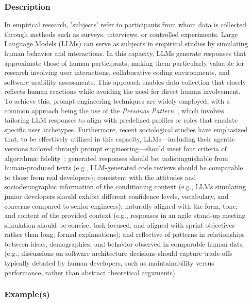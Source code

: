 \subsubsection{Description}

In empirical research, 'subjects' refer to participants from whom data is collected through methods such as surveys, interviews, or controlled experiments. Large Language Models (LLMs) can serve as subjects in empirical studies by simulating human behavior and interactions. In this capacity, LLMs generate responses that approximate those of human participants, making them particularly valuable for research involving user interactions, collaborative coding environments, and software usability assessments. This approach enables data collection that closely reflects human reactions while avoiding the need for direct human involvement.
To achieve this, prompt engineering techniques are widely employed, with a common approach being the use of the \textit{Personas Pattern}~\cite{DBLP:journals/corr/abs-2308-07702}, which involves tailoring LLM responses to align with predefined profiles or roles that emulate specific user archetypes. 
Furthermore, recent sociological studies have emphasized that, to be effectively utilized in this capacity, LLMs—including their agentic versions tailored through prompt engineering—should meet four criteria of algorithmic fidelity~\cite{DBLP:journals/corr/abs-2209-06899}; generated responses should be: indistinguishable from human-produced texts (e.g., LLM-generated code reviews should be comparable to those from real developers); consistent with the attitudes and sociodemographic information of the conditioning context (e.g., LLMs simulating junior developers should exhibit different confidence levels, vocabulary, and concerns compared to senior engineers); naturally aligned with the form, tone, and content of the provided context (e.g., responses in an agile stand-up meeting simulation should be concise, task-focused, and aligned with sprint objectives rather than long, formal explanations); and reflective of patterns in relationships between ideas, demographics, and behavior observed in comparable human data (e.g., discussions on software architecture decisions should capture trade-offs typically debated by human developers, such as maintainability versus performance, rather than abstract theoretical arguments).

\subsubsection{Example(s)}

